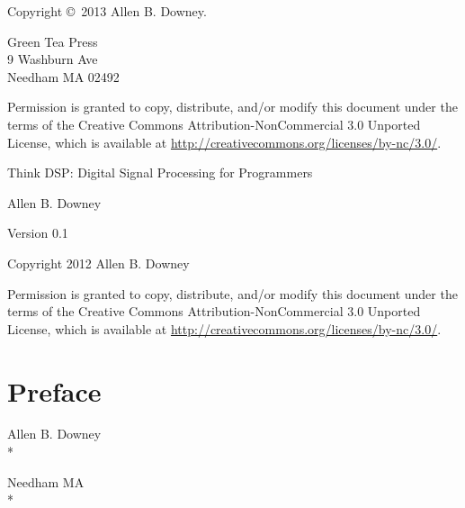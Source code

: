 \documentclass[12pt]{book}
\newcommand{\thetitle}{Think DSP: Digital Signal Processing for Programmers}
\newcommand{\theversion}{0.1}
\begin{document}
\begin{latexonly}
Copyright \copyright ~2013 Allen B. Downey.


\vspace{0.2in}

\begin{flushleft}
Green Tea Press       \\
9 Washburn Ave \\
Needham MA 02492
\end{flushleft}

Permission is granted to copy, distribute, and/or modify this document
under the terms of the Creative Commons Attribution-NonCommercial 3.0 Unported
License, which is available at \url{http://creativecommons.org/licenses/by-nc/3.0/}.

\vspace{0.2in}

\end{latexonly}



\begin{htmlonly}


{\Large \thetitle}

{\large Allen B. Downey}

Version \theversion

\vspace{0.25in}

Copyright 2012 Allen B. Downey

\vspace{0.25in}

Permission is granted to copy, distribute, and/or modify this document
under the terms of the Creative Commons Attribution-NonCommercial 3.0
Unported License, which is available at
\url{http://creativecommons.org/licenses/by-nc/3.0/}.

\setcounter{chapter}{-1}

\end{htmlonly}

\fi

\chapter{Preface}
\label{preface}



Allen B. Downey \\*

Needham MA \\*
\end{document}
